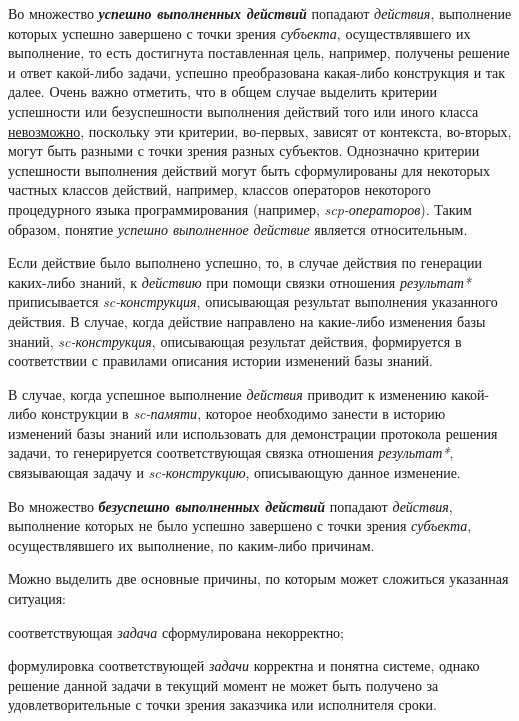 \begin{frame}{}
Во множество \textbf{\textit{успешно выполненных действий}} попадают \textit{действия}, выполнение которых успешно завершено с точки зрения \textit{субъекта}, осуществлявшего их выполнение, то есть достигнута поставленная цель, например, получены решение и ответ какой-либо задачи, успешно преобразована какая-либо конструкция и так далее. Очень важно отметить, что в общем случае выделить критерии успешности или безуспешности выполнения действий того или иного класса \uline{невозможно}, поскольку эти критерии, во-первых, зависят от контекста, во-вторых, могут быть разными с точки зрения разных субъектов. Однозначно критерии успешности выполнения действий могут быть сформулированы для некоторых частных классов действий, например, классов операторов некоторого процедурного языка программирования (например, \textit{scp-операторов}). Таким образом, понятие \textit{успешно выполненное действие} является относительным.
\end{frame}

\begin{frame}{}
Если действие было выполнено успешно, то, в случае действия по генерации каких-либо знаний, к \textit{действию} при помощи связки отношения \textit{результат*} приписывается \textit{sc-конструкция}, описывающая результат выполнения указанного действия. В случае, когда действие направлено на какие-либо изменения базы знаний, \textit{sc-конструкция}, описывающая результат действия, формируется в соответствии с правилами описания истории изменений базы знаний.

В случае, когда успешное выполнение \textit{действия} приводит к изменению какой-либо конструкции в \textit{sc-памяти}, которое необходимо занести в историю изменений базы знаний или использовать для демонстрации протокола решения задачи, то генерируется соответствующая связка отношения \textit{результат*}, связывающая задачу и \textit{sc-конструкцию}, описывающую данное изменение.
\end{frame}

\begin{frame}{}
Во множество \textbf{\textit{безуспешно выполненных действий}} попадают \textit{действия}, выполнение которых не было успешно завершено с точки зрения \textit{субъекта}, осуществлявшего их выполнение, по каким-либо причинам.

Можно выделить две основные причины, по которым может сложиться указанная ситуация:
\begin{textitemize}
	\item соответствующая \textit{задача} сформулирована некорректно;
	\item формулировка соответствующей \textit{задачи} корректна и понятна системе, однако решение данной задачи в текущий момент не может быть получено за удовлетворительные с точки зрения заказчика или исполнителя сроки.
\end{textitemize}
\end{frame}

